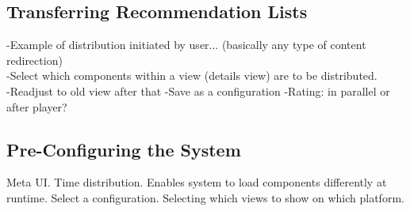 \subsection{Transferring Recommendation Lists}
-Example of distribution initiated by user... (basically any type of content redirection)\\
-Select which components within a view (details view) are to be distributed.\\
-Readjust to old view after that
-Save as a configuration
-Rating: in parallel or after player?

\subsection{Pre-Configuring the System}
Meta UI. Time distribution. Enables system to load components differently at runtime. Select a configuration. Selecting which views to show on which platform.  

